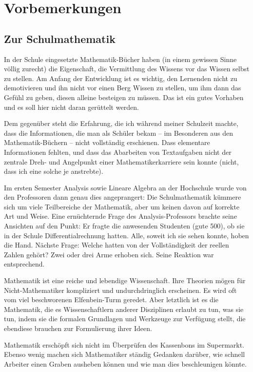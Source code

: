 \chapter{Vorbemerkungen}

\section{Zur Schulmathematik}

In der Schule eingesetzte Mathematik-Bücher haben (in einem gewissen Sinne völlig zurecht) die Eigenschaft, die Vermittlung des Wissens vor das Wissen selbst zu stellen. Am Anfang der Entwicklung ist es wichtig, den Lernenden nicht zu demotivieren und ihn nicht vor einen Berg Wissen zu stellen, um ihm dann das Gefühl zu geben, diesen alleine besteigen zu müssen. Das ist ein gutes Vorhaben und es soll hier nicht daran gerüttelt werden. 

Dem gegenüber steht die Erfahrung, die ich während meiner Schulzeit machte, dass die Informationen, die man als Schüler bekam -- im Besonderen aus den Mathematik-Büchern -- nicht vollständig erschienen. Dass elementare Informationen fehlten, und dass das Abarbeiten von Textaufgaben nicht der zentrale Dreh- und Angelpunkt einer Mathematikerkarriere sein konnte (nicht, dass ich eine solche je anstrebte).

Im ersten Semester Analysis sowie Lineare Algebra an der Hochschule wurde von den Professoren dann genau dies angeprangert: Die Schulmathematik kümmere sich um viele Teilbereiche der Mathematik, aber um keinen davon auf korrekte Art und Weise. Eine ernüchternde Frage des Analysis-Professors brachte seine Ansichten auf den Punkt: Er fragte die anwesenden Studenten (gute 500), ob sie in der Schule Differentialrechnung hatten. Alle, soweit ich sie sehen konnte, hoben die Hand. Nächste Frage: Welche hatten von der Vollständigkeit der reellen Zahlen gehört? Zwei oder drei Arme erhoben sich. Seine Reaktion war entsprechend. 

Mathematik ist eine reiche und lebendige Wissenschaft. Ihre Theorien mögen für Nicht-Mathematiker kompliziert und undurchdringlich erscheinen. Es wird oft vom viel beschworenen Elfenbein-Turm geredet. Aber letztlich ist es die Mathematik, die es Wissenschaftlern anderer Disziplinen erlaubt zu tun, was sie tun, indem sie die formalen Grundlagen und Werkzeuge zur Verfügung stellt, die ebendiese brauchen zur Formulierung ihrer Ideen.

Mathematik erschöpft sich nicht im Überprüfen des Kassenbons im Supermarkt. Ebenso wenig machen sich Mathematiker ständig Gedanken darüber, wie schnell Arbeiter einen Graben ausheben können und wie man dies beschleunigen könnte. 


